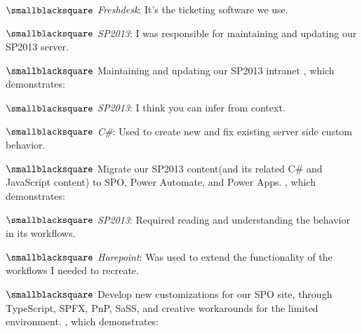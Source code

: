 \documentclass[10mm,letterpaper,notitlepage]{article}
\begin{document}
{{{										\nopagebreak
										$\smallblacksquare$ \textit{Freshdesk}: It's the ticketing software we use.
										
										$\smallblacksquare$ \textit{SP2013}: I was responsible for maintaining and updating our SP2013 server.
										
										\setlength{\parindent}{\parindent-4mm}
									\par}
									{\color[RGB]{0, 0, 0}
									\fontsize{2.25mm}{3.0mm}\selectfont
									$\smallblacksquare$
									Maintaining and updating our SP2013 intranet
									, which demonstrates:
										\setlength{\parindent}{\parindent+4mm}
										
										\nopagebreak
										$\smallblacksquare$ \textit{SP2013}: I think you can infer from context.
										
										$\smallblacksquare$ \textit{C\#}: Used to create new and fix existing server side custom behavior.
										
										\setlength{\parindent}{\parindent-4mm}
									\par}
									{\color[RGB]{0, 0, 0}
									\fontsize{2.25mm}{3.0mm}\selectfont
									$\smallblacksquare$
									Migrate our SP2013 content(and its related C\# and JavaScript content) to SPO, Power Automate, and Power Apps.
									, which demonstrates:
										\setlength{\parindent}{\parindent+4mm}
										
										\nopagebreak
										$\smallblacksquare$ \textit{SP2013}: Required reading and understanding the behavior in its workflows.
										
										$\smallblacksquare$ \textit{Harepoint}: Was used to extend the functionality of the workflows I needed to recreate.
										
										\setlength{\parindent}{\parindent-4mm}
									\par}
									{\color[RGB]{0, 0, 0}
									\fontsize{2.25mm}{3.0mm}\selectfont
									$\smallblacksquare$
									Develop new customizations for our SPO site, through TypeScript, SPFX, PnP, SaSS, and creative workarounds for the limited environment.
									, which demonstrates:
										\setlength{\parindent}{\parindent+4mm}
										
}}}
\end{document}
